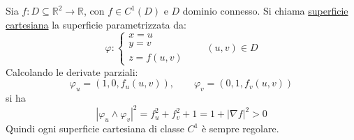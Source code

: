 \begin{esercizio}
Sia $f : D \subseteq \mathbb{R}^2 \to \mathbb{R}$, con $f \in C^1(D)$ e $D$ dominio connesso. Si chiama \underline{superficie cartesiana} la superficie parametrizzata da:
\[
\varphi : \begin{cases}
x = u \\
y = v \\
z = f(u, v)
\end{cases}
\qquad (u, v) \in D
\]
Calcolando le derivate parziali:
\[
\varphi_u = (1, 0, f_u(u, v)), \qquad \varphi_v = (0, 1, f_v(u, v))
\]
si ha
\[
|\varphi_u \wedge \varphi_v|^2 = f_u^2 + f_v^2 + 1 = 1 + |\nabla f|^2 > 0
\]
Quindi ogni superficie cartesiana di classe $C^1$ è sempre regolare.
\end{esercizio}

